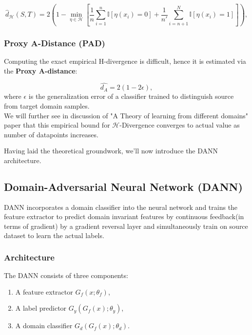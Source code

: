 \documentclass{article}
\begin{document}
\begin{equation}
\hat{d}_{\mathcal{H}}(S, T) = 2 \left( 1 - \min_{\eta \in \mathcal{H}} \left[ \frac{1}{n} \sum_{i=1}^{n} \mathbb{I}\left[\eta(x_i) = 0\right] + \frac{1}{n'} \sum_{i=n+1}^{N} \mathbb{I}\left[\eta(x_i) = 1\right] \right] \right),
\end{equation}

\subsubsection{Proxy A-Distance (PAD)}

Computing the exact empirical H-divergence is difficult, hence it is estimated via the \textbf{Proxy A-distance}:

\begin{equation}
\hat{d_A} = 2(1 - 2\epsilon),
\end{equation}
where \( \epsilon \) is the generalization error of a classifier trained to distinguish source from target domain samples.
\\
We will further see in discussion of "A Theory of learning from different domains" paper that this empirical bound for $\mathcal{H}$-Divergence converges to actual value as number of datapoints increases.

Having laid the theoretical groundwork, we'll now introduce the DANN architecture.



\subsection{Domain-Adversarial Neural Network (DANN)}

DANN incorporates a domain classifier into the neural network and trains the feature extractor to predict domain invariant features by continuous feedback(in terms of gradient) by a gradient reversal layer and simultaneously train on source dataset to learn the actual labels.

\subsubsection{Architecture}

The DANN consists of three components:
\begin{enumerate}[noitemsep]
    \item A feature extractor \( G_f(x; \theta_f) \),
    \item A label predictor \( G_y(G_f(x); \theta_y) \),
    \item A domain classifier \( G_d(G_f(x); \theta_d) \).
\end{enumerate}
\end{document}
